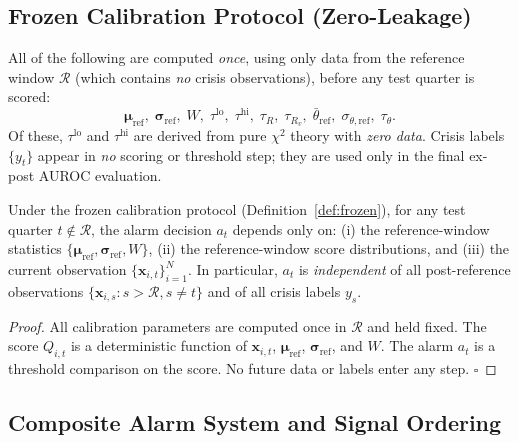 \documentclass[journal]{IEEEtran}
\begin{document}
\subsection{Frozen Calibration Protocol (Zero-Leakage)}
\label{ssec:frozen}

\begin{definition}
\label{def:frozen}
All of the following are computed \emph{once}, using only data from the
reference window $\mathcal{R}$ (which contains \emph{no} crisis observations),
before any test quarter is scored:
\[
  \boldsymbol{\mu}_{\mathrm{ref}},\;
  \boldsymbol{\sigma}_{\mathrm{ref}},\;
  W,\;
  \tau^{\mathrm{lo}},\; \tau^{\mathrm{hi}},\;
  \tau_R,\; \tau_{R_v},\;
  \bar\theta_{\mathrm{ref}},\; \sigma_{\theta,\mathrm{ref}},\; \tau_\theta.
\]
Of these, $\tau^{\mathrm{lo}}$ and $\tau^{\mathrm{hi}}$ are derived from
pure $\chi^2$ theory with \emph{zero data}.  Crisis labels
$\{y_t\}$ appear in \emph{no} scoring or threshold step; they are used
only in the final ex-post AUROC evaluation.
\end{definition}

\begin{theorem}
\label{thm:noleak}
Under the frozen calibration protocol (Definition~\ref{def:frozen}), for any
test quarter $t \notin \mathcal{R}$, the alarm decision $a_t$ depends only on:
(i) the reference-window statistics $\{\boldsymbol{\mu}_{\mathrm{ref}},
\boldsymbol{\sigma}_{\mathrm{ref}}, W\}$,
(ii) the reference-window score distributions, and
(iii) the current observation $\{\mathbf{x}_{i,t}\}_{i=1}^N$.
In particular, $a_t$ is \emph{independent} of all post-reference observations
$\{\mathbf{x}_{i,s} : s > \mathcal{R}, s \ne t\}$ and of all crisis labels $y_s$.
\end{theorem}

\begin{proof}
All calibration parameters are computed once in $\mathcal{R}$ and held fixed.
The score $Q_{i,t}$ is a deterministic function of
$\mathbf{x}_{i,t}$, $\boldsymbol{\mu}_{\mathrm{ref}}$,
$\boldsymbol{\sigma}_{\mathrm{ref}}$, and $W$.  The alarm $a_t$ is a
threshold comparison on the score.  No future data or labels enter any
step. $\square$
\end{proof}

\subsection{Composite Alarm System and Signal Ordering}
\label{ssec:alarms}
\end{document}
